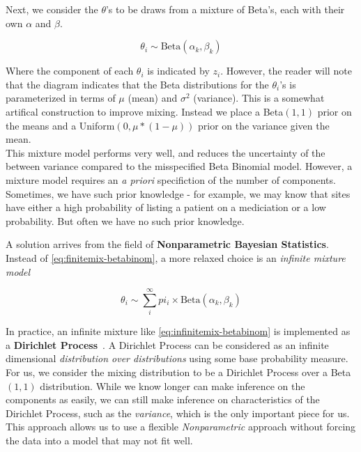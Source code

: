 \documentclass{article}
\begin{document}
Next, we consider the $\theta$'s to be draws from a mixture of Beta's, each with their own $\alpha$ and $\beta$.

\begin{equation}\label{eq:theta}
    \theta_i \sim \text{Beta}(\alpha_k, \beta_k)
\end{equation}

Where the component of each $\theta_i$ is indicated by $z_i$. However, the reader will note that the diagram indicates that the Beta distributions for the $\theta_i$'s is parameterized in terms of $\mu$ (mean) and $\sigma^2$ (variance). This is a somewhat artifical construction to improve mixing. Instead we place a Beta$(1, 1)$ prior on the means and a Uniform$(0, \mu * (1-\mu))$ prior on the variance given the mean. \\

This mixture model performs very well, and reduces the uncertainty of the between variance compared to the misspecified Beta Binomial model. However, a mixture model requires an \textit{a priori} specifiction of the number of components. Sometimes, we have such prior knowledge - for example, we may know that sites have either a high probability of listing a patient on a mediciation or a low probability. But often we have no such prior knowledge. 

A solution arrives from the field of \textbf{Nonparametric Bayesian Statistics}. Instead of \eqref{eq:finitemix-betabinom}, a more relaxed choice is an \textit{infinite mixture model}

\begin{equation}\label{eq:infinitemix-betabinom}
\theta_i \sim \sum_i^{\infty} pi_i \times \text{Beta}(\alpha_k, \beta_k)
\end{equation}

In practice, an infinite mixture like \eqref{eq:infinitemix-betabinom} is implemented as a \textbf{Dirichlet Process}~\cite{gelman2004,ohlssen2007}. A Dirichlet Process can be considered as an infinite dimensional \textit{distribution over distributions} using some base probability measure. For us, we consider the mixing distribution to be a Dirichlet Process over a Beta$(1, 1)$ distribution. While we know longer can make inference on the components as easily, we can still make inference on characteristics of the Dirichlet Process, such as the \textit{variance}, which is the only important piece for us. This approach allows us to use a flexible \textit{Nonparametric} approach without forcing the data into a model that may not fit well.
\end{document}
